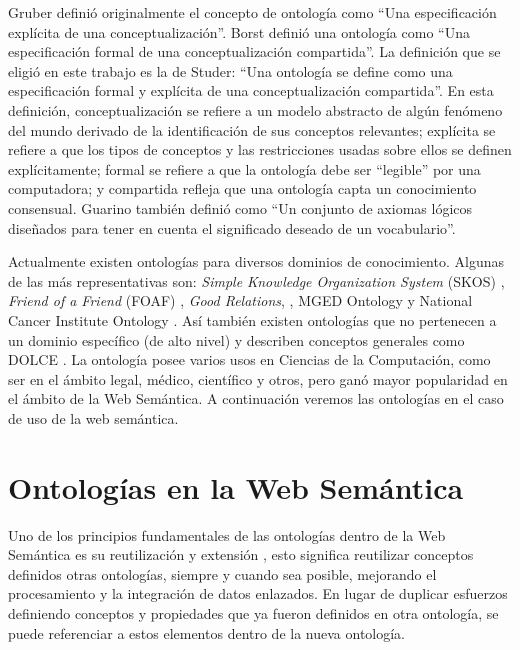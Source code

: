 Gruber\cite{gruber1993translation} definió originalmente el concepto de ontología como “Una especificación explícita de una conceptualización”. Borst\cite{borst1997construction} definió una ontología como “Una especificación formal de una conceptualización compartida”. La definición que se eligió en este trabajo es la de Studer\cite{studer1998knowledge}: “Una ontología se define como una especificación formal y explícita de una conceptualización compartida”.  En esta definición, conceptualización se refiere a un modelo abstracto de algún fenómeno del mundo derivado de la identificación de sus conceptos relevantes; explícita se refiere a que los tipos de conceptos y las restricciones usadas sobre ellos se definen explícitamente; formal se refiere a que la ontología debe ser “legible” por una computadora; y compartida refleja que una ontología capta un conocimiento consensual. Guarino\cite{guarino1998formal} también definió como “Un conjunto de axiomas lógicos diseñados para tener en cuenta el significado deseado de un vocabulario”.

Actualmente existen ontologías para diversos dominios de conocimiento. Algunas de las más representativas son: \textit{Simple Knowledge Organization System} (SKOS) \cite{isaac2009skos}, \textit{ Friend of a Friend} (FOAF) \cite{brickley2012foaf}, \textit{Good Relations}, \cite{hepp2008goodrelations}, MGED Ontology \cite{whetzel2006mged} y National Cancer Institute Ontology \cite{golbeck2011national}. Así también existen ontologías que no pertenecen a un dominio específico (de alto nivel) y describen conceptos generales como DOLCE\cite{dolce} \cite{Masolo02thewonderweb}.
La ontología posee varios usos en Ciencias de la Computación, como ser en el ámbito legal, médico, científico y otros, pero ganó mayor popularidad en el ámbito de la Web Semántica. A continuación veremos las ontologías en el caso de uso de la web semántica.


\section{Ontologías en la Web Semántica}
Uno de los principios fundamentales de las ontologías dentro de la Web Semántica es su reutilización y extensión \cite{Thorsen2015OntologiesIT}, esto significa reutilizar conceptos definidos otras ontologías, siempre y cuando sea posible, mejorando el procesamiento y la integración de datos enlazados. En lugar de duplicar esfuerzos definiendo conceptos y propiedades que ya fueron definidos en otra ontología, se puede referenciar a estos elementos dentro de la nueva ontología. 

